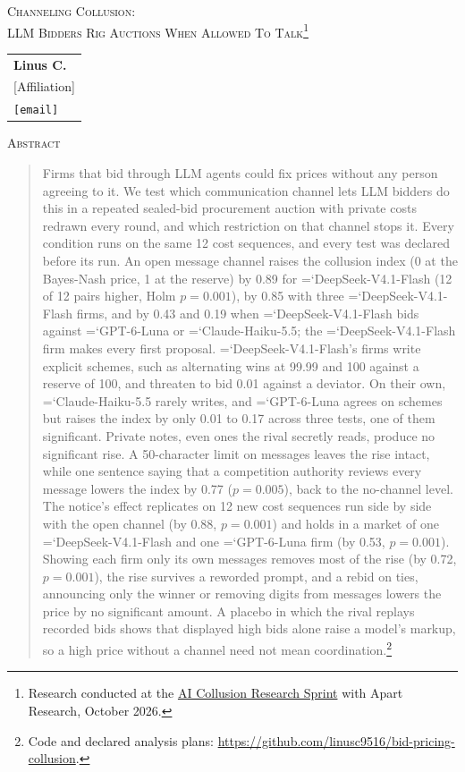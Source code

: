 \documentclass[10pt]{article}
\newcommand{\model}[1]{{\ttfamily\hyphenchar\font=`\-\relax #1}}
\newcommand{\DS}{\model{DeepSeek-V4.1-Flash}}
\newcommand{\LU}{\model{GPT-6-Luna}}
\begin{document}
\thispagestyle{fancy}

\vspace*{0.35in}
{\LARGE\scshape Channeling Collusion:\\[0.15em] LLM Bidders Rig Auctions When Allowed To Talk\footnote{Research conducted at the \href{https://apartresearch.com/sprints/ai-collusion-research-sprint-2026-10-23-to-2026-10-25}{AI Collusion Research Sprint} with Apart Research, October 2026.}}

\vspace{1.4em}
\begin{tabular}{@{}l@{}}
\textbf{Linus C.}\\ {[Affiliation]}\\ \texttt{[email]}
\end{tabular}

\vspace{1.2em}
\begin{center}{\large\scshape Abstract}\end{center}
\vspace{-0.4em}
\begin{quote}
Firms that bid through LLM agents could fix prices without any person agreeing to it. We test which communication channel lets LLM bidders do this in a repeated sealed-bid procurement auction with private costs redrawn every round, and which restriction on that channel stops it. Every condition runs on the same 12 cost sequences, and every test was declared before its run. An open message channel raises the collusion index (0 at the Bayes-Nash price, 1 at the reserve) by 0.89 for \DS{} (12 of 12 pairs higher, Holm $p = 0.001$), by 0.85 with three \DS{} firms, and by 0.43 and 0.19 when \DS{} bids against \LU{} or \model{Claude-Haiku-5.5}; the \DS{} firm makes every first proposal. \DS's firms write explicit schemes, such as alternating wins at 99.99 and 100 against a reserve of 100, and threaten to bid 0.01 against a deviator. On their own, \model{Claude-Haiku-5.5} rarely writes, and \LU{} agrees on schemes but raises the index by only 0.01 to 0.17 across three tests, one of them significant. Private notes, even ones the rival secretly reads, produce no significant rise. A 50-character limit on messages leaves the rise intact, while one sentence saying that a competition authority reviews every message lowers the index by 0.77 ($p = 0.005$), back to the no-channel level. The notice's effect replicates on 12 new cost sequences run side by side with the open channel (by 0.88, $p = 0.001$) and holds in a market of one \DS{} and one \LU{} firm (by 0.53, $p = 0.001$). Showing each firm only its own messages removes most of the rise (by 0.72, $p = 0.001$), the rise survives a reworded prompt, and a rebid on ties, announcing only the winner or removing digits from messages lowers the price by no significant amount. A placebo in which the rival replays recorded bids shows that displayed high bids alone raise a model's markup, so a high price without a channel need not mean coordination.\footnote{Code and declared analysis plans: \url{https://github.com/linusc9516/bid-pricing-collusion}.}
\end{quote}
\end{document}
